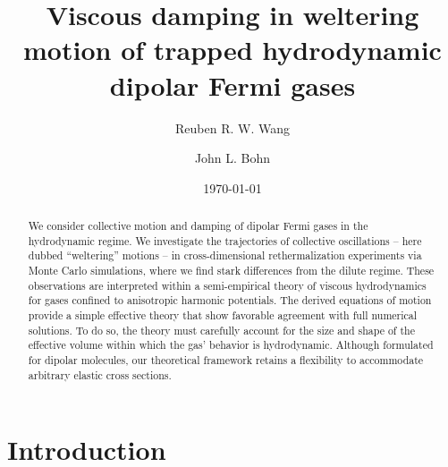\documentclass[reprint, amsmath, amssymb, aps, superscriptaddress]{revtex4-1}
\begin{document}

\title{ Viscous damping in weltering motion of trapped hydrodynamic dipolar Fermi gases }

\author{Reuben R. W. Wang}
\author{John L. Bohn}
\date{\today} 

\begin{abstract}

We consider collective motion and damping of dipolar Fermi gases in the hydrodynamic regime.
We investigate the trajectories of collective oscillations -- here dubbed ``weltering'' motions -- in cross-dimensional rethermalization experiments via Monte Carlo simulations, where we find stark differences from the dilute regime. These observations are interpreted within a semi-empirical theory of viscous hydrodynamics for gases confined to anisotropic harmonic potentials. 
The derived equations of motion provide a simple effective theory that show favorable agreement with full numerical solutions. To do so, the theory must carefully account for the size and shape of the effective volume within which the gas' behavior is hydrodynamic.
Although formulated for dipolar molecules, our theoretical framework retains a flexibility to accommodate arbitrary elastic cross sections.  
      

\end{abstract}

\maketitle


\section{ \label{sec:introduction} Introduction }
\end{document}

